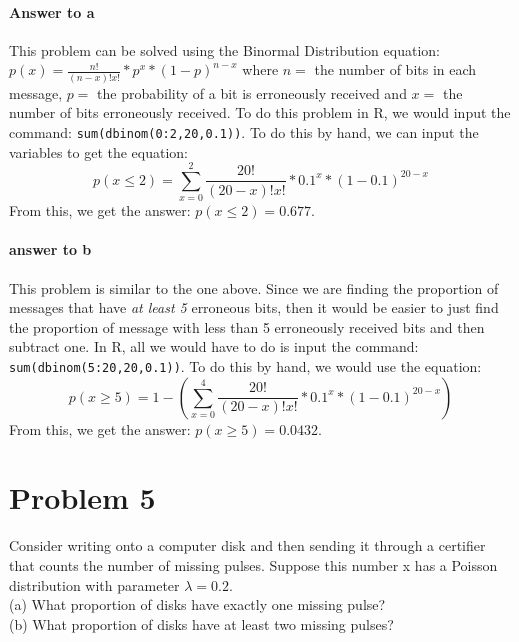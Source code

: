 \documentclass{article}
\newcommand{\code}[1]{\texttt{#1}}
\begin{document}
	\paragraph{Answer to a} This problem can be solved using the Binormal Distribution equation: 
	$p(x) = \frac{n!}{(n-x)!x!} * p^x * (1-p)^{n-x}$ where $n=$ the number of bits in each message, 
	$p=$ the probability of a bit is erroneously received and $x=$ the number of bits erroneously 
	received. To do this problem in R, we would input the command:
	\code{sum(dbinom(0:2,20,0.1))}. To do this by hand, we can input the variables to get the 
	equation:
	\begin{displaymath}
		p(x \le 2) = \sum_{x=0}^{2} \frac{20!}{(20-x)!x!} * 0.1^x * (1-0.1)^{20-x}
	\end{displaymath}
	From this, we get the answer: $p(x \le 2) = 0.677$. %
	
	\paragraph{answer to b} This problem is similar to the one above. Since we are finding the 
	proportion of messages that have \emph{at least 5} erroneous bits, then it would be easier to 
	just find the proportion of message with less than 5 erroneously received bits and then subtract 
	one. In R, all we would have to do is input the command: \code{sum(dbinom(5:20,20,0.1))}. To 
	do this by hand, we would use the equation:
	\begin{displaymath}
		p(x \ge 5) =1 - (\sum_{x=0}^{4} \frac{20!}{(20-x)!x!} * 0.1^x * (1-0.1)^{20-x})
	\end{displaymath}
	From this, we get the answer: $p(x \ge 5) = 0.0432$. %

\clearpage
\section*{Problem 5}

	Consider writing onto a computer disk and then sending it through a certifier that counts the 
	number of missing pulses. Suppose this number x has a Poisson distribution with parameter $
	\lambda = 0.2$. \\

	(a) What proportion of disks have exactly one missing pulse? \\
	(b) What proportion of disks have at least two missing pulses?
\end{document}
